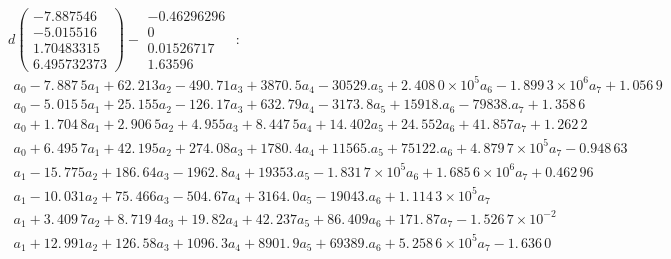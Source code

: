 \documentclass{article}
\begin{document}
$\allowbreak d(%
\begin{array}{c}
-7.887546 \\ 
-5.015516 \\ 
1.70483315 \\ 
6.495732373%
\end{array}%
)-%
\begin{array}{c}
-0.46296296 \\ 
0 \\ 
0.01526717 \\ 
1.63596%
\end{array}%
\allowbreak $ : $%
\begin{array}{c}
a_{0}-7.\,\allowbreak 887\,5a_{1}+62.\,\allowbreak
213a_{2}-490.\,\allowbreak 71a_{3}+3870.\,\allowbreak
5a_{4}-30529.a_{5}+2.\,\allowbreak 408\,0\times 10^{5}a_{6}-1.\,\allowbreak
899\,3\times 10^{6}a_{7}+1.\,\allowbreak 056\,9 \\ 
a_{0}-5.\,\allowbreak 015\,5a_{1}+25.\,\allowbreak
155a_{2}-126.\,\allowbreak 17a_{3}+632.\,\allowbreak
79a_{4}-3173.\,\allowbreak 8a_{5}+15918.a_{6}-79838.a_{7}+1.\,\allowbreak
358\,6 \\ 
a_{0}+1.\,\allowbreak 704\,8a_{1}+2.\,\allowbreak
906\,5a_{2}+4.\,\allowbreak 955a_{3}+8.\,\allowbreak
447\,5a_{4}+14.\,\allowbreak 402a_{5}+24.\,\allowbreak
552a_{6}+41.\,\allowbreak 857a_{7}+1.\,\allowbreak 262\,2 \\ 
a_{0}+6.\,\allowbreak 495\,7a_{1}+42.\,\allowbreak
195a_{2}+274.\,\allowbreak 08a_{3}+1780.\,\allowbreak
4a_{4}+11565.a_{5}+75122.a_{6}+4.\,\allowbreak 879\,7\times
10^{5}a_{7}-0.948\,63 \\ 
a_{1}-15.\,\allowbreak 775a_{2}+186.\,\allowbreak 64a_{3}-1962.\,\allowbreak
8a_{4}+19353.a_{5}-1.\,\allowbreak 831\,7\times 10^{5}a_{6}+1.\,\allowbreak
685\,6\times 10^{6}a_{7}+0.462\,96 \\ 
a_{1}-10.\,\allowbreak 031a_{2}+75.\,\allowbreak 466a_{3}-504.\,\allowbreak
67a_{4}+3164.\,\allowbreak 0a_{5}-19043.a_{6}+1.\,\allowbreak 114\,3\times
10^{5}a_{7} \\ 
a_{1}+3.\,\allowbreak 409\,7a_{2}+8.\,\allowbreak
719\,4a_{3}+19.\,\allowbreak 82a_{4}+42.\,\allowbreak
237a_{5}+86.\,\allowbreak 409a_{6}+171.\,\allowbreak 87a_{7}-1.\,\allowbreak
526\,7\times 10^{-2} \\ 
a_{1}+12.\,\allowbreak 991a_{2}+126.\,\allowbreak 58a_{3}+1096.\,\allowbreak
3a_{4}+8901.\,\allowbreak 9a_{5}+69389.a_{6}+5.\,\allowbreak 258\,6\times
10^{5}a_{7}-1.\,\allowbreak 636\,0%
\end{array}%
$
\end{document}
